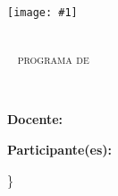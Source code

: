 \documentclass[11pt]{article}
\begin{document}
\newcommand{\modentitlepage}[1]\{
\begin{titlepage} 
    \noindent

    \noindent\begin{minipage}{0.2\textwidth}
        \texttt{[image: \#1]} 
    \end{minipage}%
    \hfill%
    \begin{minipage}{0.8\textwidth} %
        \scshape
        \textbf{\university } \vspace*{2mm} \\ 
        \facultad~ programa de \\ \program
    \end{minipage}


    \vspace*{3cm}
    \hfill
    \begin{minipage}{0.8\textwidth}
        \bfseries
        \Large
        \subject 
        \vspace*{1cm} \\

        \begin{minipage}{0.9\textwidth}
          \Huge
          \@title
        \end{minipage}

        \vspace*{4cm} 

        \Large
        \@date

        \vspace*{3cm}
        \hrulefill \par
        \vspace*{1cm}

        \large
        \mdseries	
        \textbf{Docente:} \\
        \docente

        \vspace*{1cm}

        \textbf{Participante(es):} \\ 
        \@author
    \end{minipage}
\end{titlepage}
    \restoregeometry
\}
\end{document}
